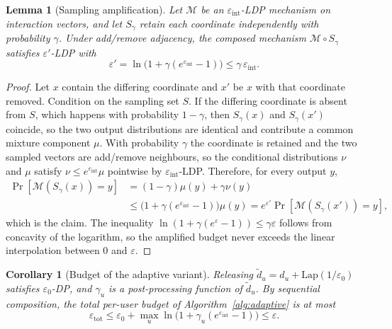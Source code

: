\documentclass[pdflatex,sn-basic,Numbered]{sn-jnl}
\theoremstyle{plain}
\newtheorem{lemma}[theorem]{Lemma}
\newtheorem{corollary}[theorem]{Corollary}
\theoremstyle{remark}
\theoremstyle{definition}
\newcommand{\eps}{\varepsilon}
\newcommand{\Prob}{\Pr}
\begin{document}
\begin{lemma}[Sampling amplification]\label{lem:amplification}
Let $\mathcal{M}$ be an $\eps_{\text{int}}$-LDP mechanism on interaction vectors, and let $S_\gamma$ retain each coordinate independently with probability $\gamma$. Under add/remove adjacency, the composed mechanism $\mathcal{M}\circ S_\gamma$ satisfies $\eps'$-LDP with
\begin{equation}\label{eq:amplification}
\eps'=\ln\!\big(1+\gamma(e^{\eps_{\text{int}}}-1)\big)\le\gamma\,\eps_{\text{int}}.
\end{equation}
\end{lemma}

\begin{proof}
Let $x$ contain the differing coordinate and $x'$ be $x$ with that coordinate removed. Condition on the sampling set $S$. If the differing coordinate is absent from $S$, which happens with probability $1-\gamma$, then $S_\gamma(x)$ and $S_\gamma(x')$ coincide, so the two output distributions are identical and contribute a common mixture component $\mu$. With probability $\gamma$ the coordinate is retained and the two sampled vectors are add/remove neighbours, so the conditional distributions $\nu$ and $\mu$ satisfy $\nu\le e^{\eps_{\text{int}}}\mu$ pointwise by $\eps_{\text{int}}$-LDP. Therefore, for every output $y$,
\begin{equation}
\begin{aligned}
\Prob[\mathcal{M}(S_\gamma(x))=y]&=(1-\gamma)\mu(y)+\gamma\nu(y)\\
&\le\big(1+\gamma(e^{\eps_{\text{int}}}-1)\big)\mu(y)
=e^{\eps'}\Prob[\mathcal{M}(S_\gamma(x'))=y],
\end{aligned}
\end{equation}
which is the claim. The inequality $\ln(1+\gamma(e^{\eps}-1))\le\gamma\eps$ follows from concavity of the logarithm, so the amplified budget never exceeds the linear interpolation between $0$ and $\eps$.
\end{proof}

\begin{corollary}[Budget of the adaptive variant]\label{cor:budget}
Releasing $\tilde d_u=d_u+\mathrm{Lap}(1/\eps_0)$ satisfies $\eps_0$-DP, and $\gamma_u$ is a post-processing function of $\tilde d_u$. By sequential composition, the total per-user budget of Algorithm~\ref{alg:adaptive} is at most
\begin{equation}\label{eq:totalbudget}
\eps_{\text{tot}}\le\eps_0+\max_{u}\ln\!\big(1+\gamma_u(e^{\eps_{\text{int}}}-1)\big)\le\eps .
\end{equation}
\end{corollary}
\end{document}

